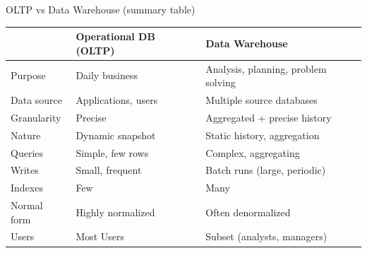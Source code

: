 \documentclass[10pt,aspectratio=169]{beamer}
\begin{document}
\begin{frame}{OLTP vs Data Warehouse (summary table)}
\scriptsize
\begin{tabular}{@{}p{3.2cm}p{5.4cm}p{5.2cm}@{}}
\toprule
 & \textbf{Operational DB (OLTP)} & \textbf{Data Warehouse} \\
\midrule
Purpose & Daily business & Analysis, planning, problem solving \\
Data source & Applications, users & Multiple source databases \\
Granularity & Precise & Aggregated + precise history \\
Nature & Dynamic snapshot & Static history, aggregation \\
Queries & Simple, few rows & Complex, aggregating \\
Writes & Small, frequent & Batch runs (large, periodic) \\
Indexes & Few & Many \\
Normal form & Highly normalized & Often denormalized \\
Users & Most Users & Subset (analysts, managers) \\
\bottomrule
\end{tabular}
\end{frame}
\end{document}
